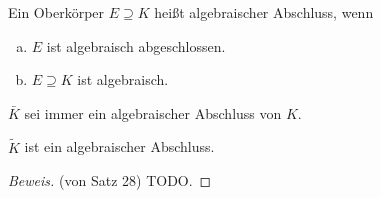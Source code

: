\documentclass[a4paper]{report}
\begin{document}
\begin{defi}
  Ein Oberkörper $E \supseteq K$ heißt algebraischer Abschluss, wenn
  \begin{enumerate}[(a)]
    \item $E$ ist algebraisch abgeschlossen.
    \item $E \supseteq K$ ist algebraisch.
  \end{enumerate}
\end{defi}
\begin{bez*}
$\bar K$ sei immer ein algebraischer Abschluss von $K$.
\end{bez*}
\begin{bem*}[zu Satz 28]
$\tilde K$ ist ein algebraischer Abschluss.
\end{bem*}
\begin{proof}[Beweis](von Satz 28)
  TODO.

\end{proof}
\end{document}
